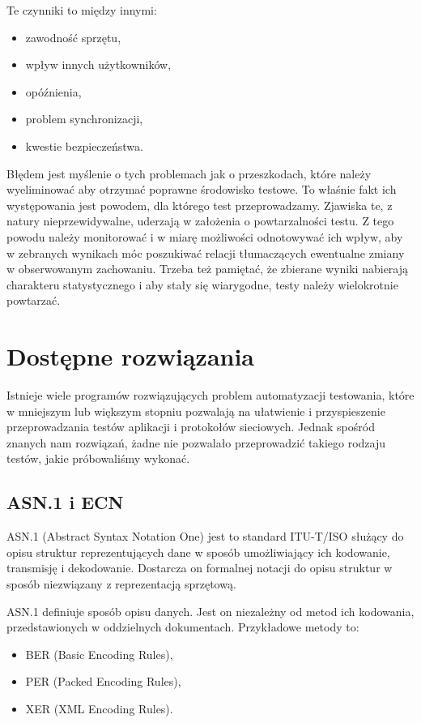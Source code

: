 \documentclass[00-praca-magisterska.tex]{subfiles}
\begin{document}
Te czynniki to między innymi:
\begin{itemize}
\item zawodność sprzętu,
\item wpływ innych użytkowników,
\item opóźnienia,
\item problem synchronizacji,
\item kwestie bezpieczeństwa.
\end{itemize}

Błędem jest myślenie o tych problemach jak o przeszkodach, które należy
wyeliminować aby otrzymać poprawne środowisko testowe. To właśnie fakt ich
występowania jest powodem, dla którego test przeprowadzamy. Zjawiska te, z
natury nieprzewidywalne, uderzają w założenia o powtarzalności testu. Z tego
powodu należy monitorować i w miarę możliwości odnotowywać ich wpływ, aby w
zebranych wynikach móc poszukiwać relacji tłumaczących ewentualne zmiany w
obserwowanym zachowaniu. Trzeba też pamiętać, że zbierane wyniki nabierają
charakteru statystycznego i aby stały się wiarygodne, testy należy wielokrotnie
powtarzać.


\section{Dostępne rozwiązania}


Istnieje wiele programów rozwiązujących problem automatyzacji testowania, które
w mniejszym lub większym stopniu pozwalają na ułatwienie i przyspieszenie
przeprowadzania testów aplikacji i protokołów sieciowych. Jednak spośród znanych
nam rozwiązań, żadne nie pozwalało przeprowadzić takiego rodzaju testów, jakie
próbowaliśmy wykonać.

\subsection{ASN.1 i ECN}
ASN.1 (Abstract Syntax Notation One) jest to standard ITU-T/ISO służący do opisu
struktur reprezentujących dane w sposób umożliwiający ich kodowanie, transmisję
i dekodowanie. Dostarcza on formalnej notacji do opisu struktur w sposób
niezwiązany z reprezentacją sprzętową.

ASN.1 definiuje sposób opisu danych. Jest on niezależny od metod ich kodowania,
przedstawionych w oddzielnych dokumentach. Przykładowe metody to:
\begin{itemize}
\item BER (Basic Encoding Rules),
\item PER (Packed Encoding Rules),
\item XER (XML Encoding Rules).
\end{itemize}
\end{document}
